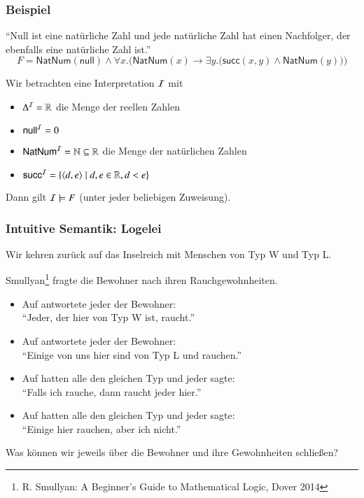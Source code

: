 \documentclass[aspectratio=1610,onlymath]{beamer}
\begin{document}
\begin{frame}\frametitle{Beispiel}

\alert{"`Null ist eine natürliche Zahl und jede natürliche Zahl hat einen Nachfolger, der
ebenfalls eine natürliche Zahl ist."'}
\[ F=\textsf{NatNum}(\textsf{null})\wedge \forall x.\Big(\textsf{NatNum}(x)\to\exists y.\big(\textsf{succ}(x,y)\wedge \textsf{NatNum}(y)\big)\Big)\]

Wir betrachten eine Interpretation $\mathcal{I}$ mit
\begin{itemize}
\item $\Delta^{\mathcal{I}}=\mathbb{R}$ die Menge der reellen Zahlen
\item $\textsf{null}^{\mathcal{I}}=0$
\item $\textsf{NatNum}^{\mathcal{I}}=\mathbb{N}\subseteq\mathbb{R}$ die Menge der natürlichen Zahlen
\item $\textsf{succ}^{\mathcal{I}}=\{\langle{d,e}\rangle\mid d,e\in\mathbb{R},d<e\}$
\end{itemize}\bigskip

Dann gilt $\mathcal{I}\models F$ (unter jeder beliebigen Zuweisung).


\end{frame}

\begin{frame}\frametitle{Intuitive Semantik: Logelei}

Wir kehren zurück auf das Inselreich mit Menschen von
Typ W und Typ L.
\bigskip

Smullyan\footnote{R. Smullyan: A Beginner's Guide to Mathematical Logic, Dover 2014} fragte die Bewohner nach ihren Rauchgewohnheiten.\pause

\begin{itemize}
\item Auf  antwortete jeder der Bewohner:\\ \alert{"`Jeder, der hier von Typ W ist, raucht."'}\\
%
\item Auf  antwortete jeder der Bewohner:\\ \alert{"`Einige von uns hier sind von Typ L und rauchen."'}
%
\item Auf  hatten alle den gleichen Typ und jeder sagte:\\ \alert{"`Falls ich rauche, dann raucht jeder hier."'}
%
\item Auf  hatten alle den gleichen Typ und jeder sagte:\\ \alert{"`Einige hier rauchen, aber ich nicht."'}
\end{itemize}

Was können wir jeweils über die Bewohner und ihre Gewohnheiten schließen?

\end{frame}
\end{document}
